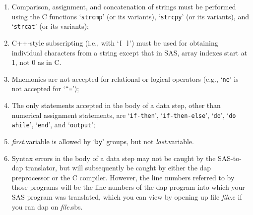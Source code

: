 \documentclass{book}
\newcommand\Texinfocommandstyletextvar[1]{{\normalfont{}\textsl{#1}}}%
\renewcommand{\_}{\Texinfounderscore\discretionary{}{}{}}
\begin{document}
\begin{enumerate}[start=1]
\item Comparison, assignment, and concatenation of strings must be performed
using the C functions `\texttt{strcmp}' (or its variants),
`\texttt{strcpy}' (or its variants), and `\texttt{strcat}' (or its variants);

\item C++-style subscripting (i.e., with `\texttt{[ ]}') must be used for obtaining
individual characters from a string except that in SAS, array indexes start at
1, not 0 as in C.

\item Mnemonics are not accepted for relational or logical operators (e.g., `\texttt{ne}'
is not accepted for `\texttt{\^{}=}');

\item The only statements accepted in the body of a data step, other than numerical
assignment statements, are `\texttt{if-then}', `\texttt{if-then-else}',
`\texttt{do}', `\texttt{do while}', `\texttt{end}', and `\texttt{output}';

\item \Texinfocommandstyletextvar{first}.variable is allowed by `\texttt{by}' groups, but not \Texinfocommandstyletextvar{last}.variable.

\item Syntax errors in the body of a data step may not be caught by the SAS-to-dap
translator, but will subsequently be caught by either the dap preprocessor
or the C compiler. However, the line numbers referred to by those programs will
be the line numbers of the dap program into which your SAS program was translated,
which you can view by opening up file \Texinfocommandstyletextvar{file}.c if you ran dap on \Texinfocommandstyletextvar{file}.sbs.

\end{enumerate}

%
\end{document}

